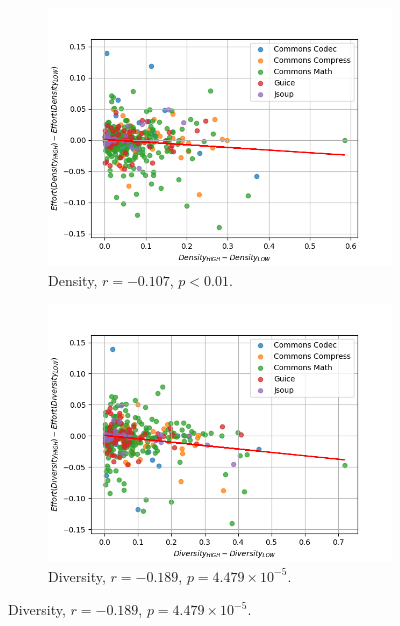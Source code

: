 \documentclass[twoside,a4paper,11pt]{memoir}
\begin{document}
\begin{figure}
    \centering
    \begin{subfigure}[b]{0.49\linewidth}
        \centering
        \includegraphics[width=\linewidth]{figures/delta_effort_density}
        \caption{Density, $r=-0.107$, $p<0.01$.}
        \label{fig:delta_effort_density}
    \end{subfigure}
    \hfill
    \begin{subfigure}[b]{0.49\linewidth}
        \centering
        \includegraphics[width=\linewidth]{figures/delta_effort_diversity}
        \caption{Diversity, $r=-0.189$, $p = 4.479\times10^{-5}$.}
        \label{fig:delta_effort_diversity}
    \end{subfigure}

\end{figure}
\end{document}
